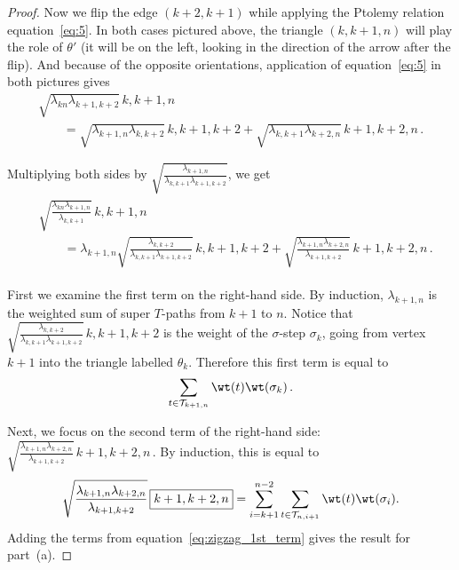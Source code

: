 \begin{proof}
 Now we flip the edge $(k+2, k+1)$ while applying the Ptolemy relation equation~\eqref{eq:5}. In both cases pictured above, the triangle $(k,k+1,n)$ will play
 the role of $\theta'$ (it will be on the left, looking in the direction of the arrow after the flip).
 And because of the opposite orientations, application of equation~\eqref{eq:5} in both pictures gives
 \begin{gather*}
 \sqrt{\lambda_{kn} \lambda_{k+1,k+2}} \, \boxed{k,k+1,n} \\
 \qquad{} = \sqrt{\lambda_{k+1,n} \lambda_{k,k+2}} \, \boxed{k,k+1,k+2} + \sqrt{\lambda_{k,k+1} \lambda_{k+2,n}} \, \boxed{k+1,k+2,n}\,.
 \end{gather*}


 Multiplying both sides by $\sqrt{\frac{\lambda_{k+1,n}}{\lambda_{k,k+1}\lambda_{k+1,k+2}}}$, we get
 \begin{gather*}
 \begin{split}
 & \sqrt{\frac{\lambda_{kn} \lambda_{k+1,n}}{\lambda_{k,k+1}}} \, \boxed{k,k+1,n}\\
& \qquad{}
 = \lambda_{k+1,n} \sqrt{\frac{\lambda_{k,k+2}}{\lambda_{k,k+1}\lambda_{k+1,k+2}}} \, \boxed{k,k+1,k+2}
 + \sqrt{\frac{\lambda_{k+1,n} \lambda_{k+2,n}}{\lambda_{k+1,k+2}}} \, \boxed{k+1,k+2,n}\,.
 \end{split}
 \end{gather*}


 First we examine the first term on the right-hand side. By induction, $\lambda_{k+1,n}$ is the weighted sum of super $T$-paths from $k+1$ to $n$.
 Notice that $\sqrt{\frac{\lambda_{k,k+2}}{\lambda_{k,k+1} \lambda_{k+1,k+2}}} \, \boxed{k,k+1,k+2}$ is the weight of the $\sigma$-step $\sigma_k$, going from
 vertex $k+1$ into the triangle labelled $\theta_k$.
 Therefore this first term is equal to
 \begin{equation} \label{eq:zigzag_1st_term}
 \sum_{t \in \mathcal{T}_{k+1,n}} \wt(t) \wt(\sigma_k)\,.
 \end{equation}

Next, we focus on the second term of the right-hand side: $\sqrt{\frac{\lambda_{k+1,n} \lambda_{k+2,n}}{\lambda_{k+1,k+2}}} \, \boxed{k+1,k+2,n}\,$.
 By induction, this is equal to
 \begin{equation*} %
 \sqrt{\frac{\lambda_{k+1,n} \lambda_{k+2,n}}{\lambda_{k+1,k+2}}} \, \boxed{k+1,k+2,n} = \sum_{i=k+1}^{n-2} \sum_{t \in \mathcal T_{n,i+1}} \wt(t) \wt(\sigma_i).
 \end{equation*}
 Adding the terms from equation~\eqref{eq:zigzag_1st_term} gives the result for part~(a).


\end{proof}
